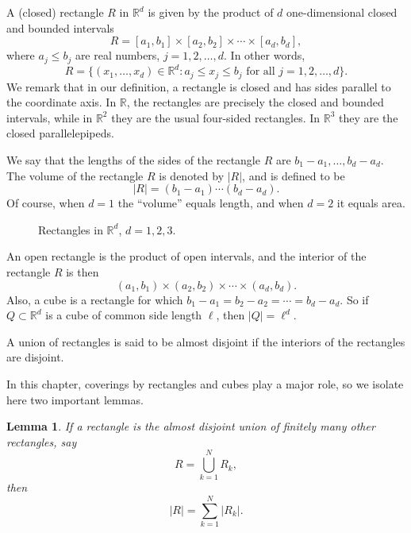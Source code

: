 \documentclass[11pt,openany]{book}
\newtheorem{lemma}[theorem]{Lemma}
\begin{document}
A (closed) rectangle $R$ in $\mathbb{R}^d$ is given by the product of $d$ one-dimensional closed and bounded intervals
\[
 R=[a_1,b_1]\times[a_2,b_2]\times\cdots\times[a_d,b_d],
\]
where $a_j\le b_j$ are real numbers, $j=1,2,\ldots,d$. In other words,
\[
 R=\{(x_1,\ldots,x_d)\in\mathbb{R}^d:a_j\le x_j\le b_j\text{ for all }j=1,2,\ldots,d\}.
\]
We remark that in our definition, a rectangle is closed and has sides parallel to the coordinate axis. In $\mathbb{R}$, the rectangles are precisely the closed and bounded intervals, while in $\mathbb{R}^2$ they are the usual four-sided rectangles. In $\mathbb{R}^3$ they are the closed parallelepipeds.

We say that the lengths of the sides of the rectangle $R$ are $b_1-a_1,\ldots,b_d-a_d$. The volume of the rectangle $R$ is denoted by $|R|$, and is defined to be
\[
 |R|=(b_1-a_1)\cdots(b_d-a_d).
\]
Of course, when $d=1$ the ``volume'' equals length, and when $d=2$ it equals area.

\begin{figure}[ht]
\centering
{}
\caption{Rectangles in $\mathbb{R}^d$, $d=1,2,3$.}
\end{figure}

An open rectangle is the product of open intervals, and the interior of the rectangle $R$ is then
\[
 (a_1,b_1)\times(a_2,b_2)\times\cdots\times(a_d,b_d).
\]
Also, a cube is a rectangle for which $b_1-a_1=b_2-a_2=\cdots=b_d-a_d$. So if $Q\subset\mathbb{R}^d$ is a cube of common side length $\ell$, then $|Q|=\ell^d$.

A union of rectangles is said to be almost disjoint if the interiors of the rectangles are disjoint.

In this chapter, coverings by rectangles and cubes play a major role, so we isolate here two important lemmas.

\begin{lemma}
If a rectangle is the almost disjoint union of finitely many other rectangles, say
\[
 R=\bigcup_{k=1}^N R_k,
\]
then
\[
 |R|=\sum_{k=1}^N |R_k|.
\]
\end{lemma}
\end{document}
